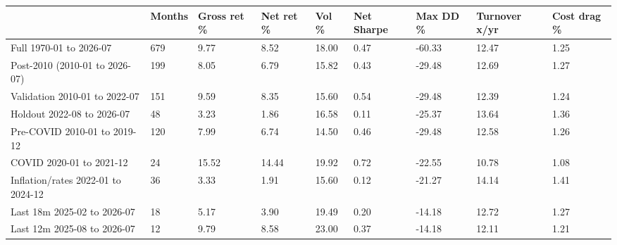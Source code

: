 \begin{tabular}{lllllllll}
\toprule
 & Months & Gross ret \% & Net ret \% & Vol \% & Net Sharpe & Max DD \% & Turnover x/yr & Cost drag \% \\
\midrule
Full 1970-01 to 2026-07 & 679 & 9.77 & 8.52 & 18.00 & 0.47 & -60.33 & 12.47 & 1.25 \\
Post-2010 (2010-01 to 2026-07) & 199 & 8.05 & 6.79 & 15.82 & 0.43 & -29.48 & 12.69 & 1.27 \\
Validation 2010-01 to 2022-07 & 151 & 9.59 & 8.35 & 15.60 & 0.54 & -29.48 & 12.39 & 1.24 \\
Holdout 2022-08 to 2026-07 & 48 & 3.23 & 1.86 & 16.58 & 0.11 & -25.37 & 13.64 & 1.36 \\
Pre-COVID 2010-01 to 2019-12 & 120 & 7.99 & 6.74 & 14.50 & 0.46 & -29.48 & 12.58 & 1.26 \\
COVID 2020-01 to 2021-12 & 24 & 15.52 & 14.44 & 19.92 & 0.72 & -22.55 & 10.78 & 1.08 \\
Inflation/rates 2022-01 to 2024-12 & 36 & 3.33 & 1.91 & 15.60 & 0.12 & -21.27 & 14.14 & 1.41 \\
Last 18m 2025-02 to 2026-07 & 18 & 5.17 & 3.90 & 19.49 & 0.20 & -14.18 & 12.72 & 1.27 \\
Last 12m 2025-08 to 2026-07 & 12 & 9.79 & 8.58 & 23.00 & 0.37 & -14.18 & 12.11 & 1.21 \\
\bottomrule
\end{tabular}

